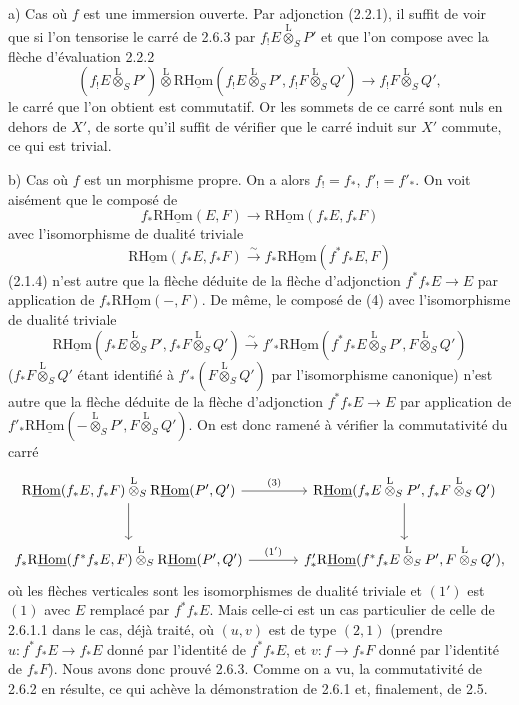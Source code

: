 a) Cas où $f$ est une immersion ouverte. Par adjonction (2.2.1), il suffit de voir que si l'on tensorise le carré de 2.6.3 par $f_!E\overset{\mathrm{L}}{\otimes}_SP'$ et que l'on compose avec la flèche d'évaluation 2.2.2
\[
(f_!E\overset{\mathrm{L}}{\otimes}_SP')\overset{\mathrm{L}}{\otimes}\mathrm{R}\underline{\mathrm{Hom}}(f_!E\overset{\mathrm{L}}{\otimes}_SP',f_!F\overset{\mathrm{L}}{\otimes}_SQ')\longrightarrow f_!F\overset{\mathrm{L}}{\otimes}_SQ',
\]
le carré que l'on obtient est commutatif. Or les sommets de ce carré sont nuls en
dehors de $X'$, de sorte qu'il suffit de vérifier que le carré induit sur $X'$ commute, ce qui est trivial.

b) Cas où $f$ est un morphisme propre. On a alors $f_!=f_*$, $f'_!=f'_*$. On voit aisément que le composé de
\[
f_*\mathrm{R}\underline{\mathrm{Hom}}(E,F)\longrightarrow\mathrm{R}\underline{\mathrm{Hom}}(f_*E,f_*F)
\]
avec l'isomorphisme de dualité triviale
\[
\mathrm{R}\underline{\mathrm{Hom}}(f_*E,f_*F)\xrightarrow{\sim}f_*\mathrm{R}\underline{\mathrm{Hom}}(f^{*}f_*E,F)
\]
(2.1.4) n'est autre que la flèche déduite de la flèche d'adjonction $f^{*}f_*E\to E$ par application de $f_*\mathrm{R}\underline{\mathrm{Hom}}(-,F)$. De même, le composé de (4) avec l'isomorphisme de dualité triviale
\[
\mathrm{R}\underline{\mathrm{Hom}}(f_*E\overset{\mathrm{L}}{\otimes}_SP',f_*F\overset{\mathrm{L}}{\otimes}_SQ')\xrightarrow{\sim}f'_*\mathrm{R}\underline{\mathrm{Hom}}(f^{*}f_*E\overset{\mathrm{L}}{\otimes}_SP',F\overset{\mathrm{L}}{\otimes}_SQ')
\]
($f_*F\overset{\mathrm{L}}{\otimes}_SQ'$ étant identifié à $f'_*(F\overset{\mathrm{L}}{\otimes}_SQ')$ par l'isomorphisme canonique) n'est autre que la flèche déduite de la flèche d'adjonction $f^{*}f_*E\to E$ par application de $f'_*\mathrm{R}\underline{\mathrm{Hom}}(-\overset{\mathrm{L}}{\otimes}_SP',F\overset{\mathrm{L}}{\otimes}_SQ')$. On est donc ramené à vérifier la commutativité du carré
\[
\begin{tikzcd}[column sep=large,row sep=large]
\mathrm{R}\underline{\mathrm{Hom}}(f_*E,f_*F)\overset{\mathrm{L}}{\otimes}_S\mathrm{R}\underline{\mathrm{Hom}}(P',Q') \arrow[r,"(3)"] \arrow[d] & \mathrm{R}\underline{\mathrm{Hom}}(f_*E\overset{\mathrm{L}}{\otimes}_SP',f_*F\overset{\mathrm{L}}{\otimes}_SQ') \arrow[d]\\
f_*\mathrm{R}\underline{\mathrm{Hom}}(f^{*}f_*E,F)\overset{\mathrm{L}}{\otimes}_S\mathrm{R}\underline{\mathrm{Hom}}(P',Q') \arrow[r,"(1')"] & f'_*\mathrm{R}\underline{\mathrm{Hom}}(f^{*}f_*E\overset{\mathrm{L}}{\otimes}_SP',F\overset{\mathrm{L}}{\otimes}_SQ'),
\end{tikzcd}
\]
où les flèches verticales sont les isomorphismes de dualité triviale et $(1')$ est $(1)$ avec $E$ remplacé par $f^{*}f_*E$. Mais celle-ci est un cas particulier de celle de 2.6.1.1 dans le cas, déjà traité, où $(u,v)$ est de type $(2,1)$ (prendre $u:f^{*}f_*E\to f_*E$ donné par l'identité de $f^{*}f_*E$, et $v:f\to f_*F$ donné par l'identité de $f_*F$). Nous avons donc prouvé 2.6.3. Comme on a vu, la commutativité de 2.6.2 en résulte, ce qui achève la démonstration de 2.6.1 et, finalement, de 2.5.


